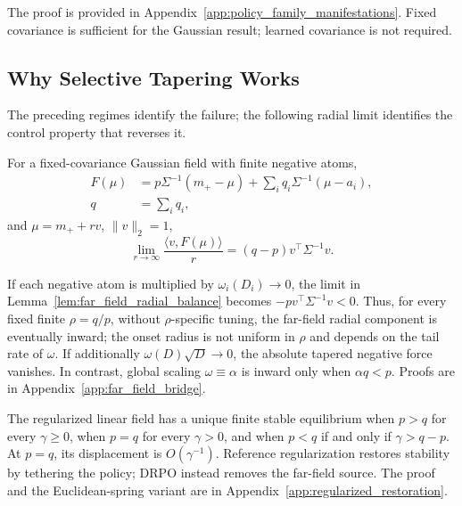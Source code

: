 \documentclass[sigconf,anonymous,review]{acmart}
\theoremstyle{acmdefinition}
\begin{document}
The proof is provided in
Appendix~\ref{app:policy_family_manifestations}.
Fixed covariance is sufficient for the Gaussian result; learned covariance is
not required.

\subsection{Why Selective Tapering Works}
\label{sec:selective_tapering_bridge}

The preceding regimes identify the failure; the following radial limit
identifies the control property that reverses it.

\begin{lemma}
\label{lem:far_field_radial_balance}
For a fixed-covariance Gaussian field with finite negative atoms,
\[
\begin{aligned}
F(\mu)&=p\Sigma^{-1}(m_+-\mu)
 +\sum_iq_i\Sigma^{-1}(\mu-a_i),\\
q&=\sum_iq_i,
\end{aligned}
\]
and \(\mu=m_++rv\), \(\|v\|_2=1\),
\[
\lim_{r\to\infty}\frac{\langle v,F(\mu)\rangle}{r}
=(q-p)v^\top\Sigma^{-1}v.
\]
\end{lemma}

\begin{corollary}
\label{cor:selective_vs_global}
If each negative atom is multiplied by
\(\omega_i(D_i)\to0\), the limit in
Lemma~\ref{lem:far_field_radial_balance} becomes
\(-p v^\top\Sigma^{-1}v<0\). Thus, for every fixed finite
\(\rho=q/p\), without \(\rho\)-specific tuning, the far-field radial
component is eventually inward; the onset radius is not uniform in
\(\rho\) and depends on the tail rate of \(\omega\). If additionally
\(\omega(D)\sqrt D\to0\), the absolute tapered negative force vanishes.
In contrast, global scaling \(\omega\equiv\alpha\) is inward only when
\(\alpha q<p\). Proofs are in Appendix~\ref{app:far_field_bridge}.
\end{corollary}

\begin{proposition}
\label{prop:regularized_restoration}
The regularized linear field has a unique finite stable equilibrium when
\(p>q\) for every \(\gamma\ge0\), when \(p=q\) for every \(\gamma>0\),
and when \(p<q\) if and only if \(\gamma>q-p\). At \(p=q\), its
displacement is \(O(\gamma^{-1})\). Reference regularization restores
stability by tethering the policy; DRPO instead removes the far-field
source. The proof and the Euclidean-spring variant are in
Appendix~\ref{app:regularized_restoration}.
\end{proposition}
\end{document}
